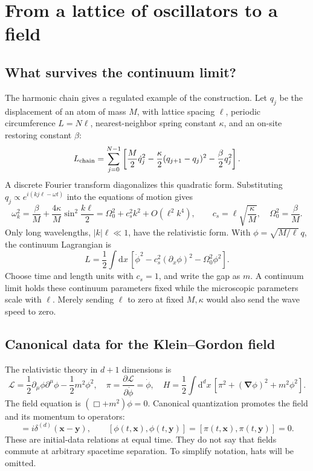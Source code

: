 \documentclass[11pt]{article}
\newcommand{\dd}{\mathrm{d}}
\newcommand{\Lag}{\mathcal{L}}
\begin{document}
\section{From a lattice of oscillators to a field}

\subsection{What survives the continuum limit?}
The harmonic chain gives a regulated example of the construction. Let
\(q_j\) be the displacement of an atom of mass \(M\), with lattice
spacing \(\ell\), periodic circumference \(L=N\ell\), nearest-neighbor
spring constant \(\kappa\), and an on-site restoring constant \(\beta\):
\begin{equation}
 L_{\rm chain}=\sum_{j=0}^{N-1}\left[
 \frac M2\dot q_j^2-\frac\kappa2(q_{j+1}-q_j)^2-\frac\beta2q_j^2\right].
 \label{s-eq:chain}
\end{equation}
A discrete Fourier transform diagonalizes this quadratic form. Substituting
\(q_j\propto e^{i(kj\ell-\omega t)}\) into the equations of motion gives
\begin{equation}
 \omega_k^2=\frac\beta M+\frac{4\kappa}{M}\sin^2\frac{k\ell}{2}
 =\Omega_0^2+c_s^2k^2+O(\ell^2k^4),\qquad
 c_s=\ell\sqrt{\frac\kappa M},\quad \Omega_0^2=\frac\beta M.
 \label{s-eq:dispersion}
\end{equation}
Only long wavelengths, \(|k|\ell\ll1\), have the relativistic form.
With \(\phi=\sqrt{M/\ell}\,q\), the continuum Lagrangian is
\[
 L=\frac12\int\dd x\,[\dot\phi^2-c_s^2(\partial_x\phi)^2-\Omega_0^2\phi^2].
\]
Choose time and length units with \(c_s=1\), and write the gap as \(m\).
A continuum limit holds these continuum parameters fixed while the
microscopic parameters scale with \(\ell\). Merely sending \(\ell\) to
zero at fixed \(M,\kappa\) would also send the wave speed to zero.

\subsection{Canonical data for the Klein--Gordon field}

The relativistic theory in \(d+1\) dimensions is
\begin{equation}
 \Lag=\frac12\partial_\mu\phi\partial^\mu\phi-\frac12m^2\phi^2,
 \quad \pi=\frac{\partial\Lag}{\partial \dot\phi}=\dot\phi,\quad
 H=\frac12\int\dd^d x\,[\pi^2+(\bm\nabla\phi)^2+m^2\phi^2].
 \label{s-eq:realaction}
\end{equation}
The field equation is \((\Box+m^2)\phi=0\).
Canonical quantization promotes the field and its momentum to operators:
\begin{equation}
 [\phi(t,\bm x),\pi(t,\bm y)]=i\delta^{(d)}(\bm x-\bm y),\qquad
 [\phi(t,\bm x),\phi(t,\bm y)]=[\pi(t,\bm x),\pi(t,\bm y)]=0.
 \label{s-eq:CCR}
\end{equation}
These are initial-data relations at equal time. They do not say that
fields commute at arbitrary spacetime separation. To simplify notation, hats will be omitted.
\end{document}
